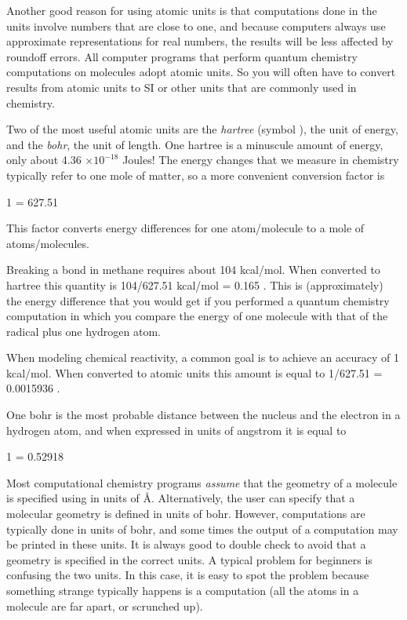 \documentclass[../Main/notes.tex]{subfiles}
\begin{document}
Another good reason for using atomic units is that computations done in the units involve numbers that are close to one, and because computers always use approximate representations for real numbers, the results will be less affected by roundoff errors.
All computer programs that perform quantum chemistry computations on molecules adopt atomic units.
So you will often have to convert results from atomic units to SI or other units that are commonly used in chemistry.

Two of the most useful atomic units are the \emph{hartree} (symbol  \Eh), the unit of energy, and the \emph{bohr}, the unit of length.
One hartree is a minuscule amount of energy, only about 4.36 $\times 10^{-18}$ Joules!
The energy changes that we measure in chemistry typically refer to one mole of matter, so a more convenient conversion factor is 
\begin{iequation}
1  = 627.51 
\end{iequation}
This factor converts energy differences for one atom/molecule to a mole of atoms/molecules.

\begin{example}
Breaking a  bond in methane requires about 104 kcal/mol. When converted to hartree this quantity is 104/627.51 kcal/mol = 0.165 \Eh.
This is (approximately) the energy difference that you would get if you performed a quantum chemistry computation in which you compare the energy of one  molecule with that of the  radical plus one hydrogen atom.
\end{example}

\begin{example}
When modeling chemical reactivity, a common goal is to achieve an accuracy of 1 kcal/mol. When converted to atomic units this amount is equal to 1/627.51 \Eh = 0.0015936 \Eh.
\end{example}

One bohr is the most probable distance between the nucleus and the electron in a hydrogen atom, and when expressed in units of angstrom it is equal to
\begin{iequation}
1  = 0.52918 \text{ \AA{}}
\end{iequation}
Most computational chemistry programs \emph{assume} that the geometry of a molecule is specified using in units of \AA{}.
Alternatively, the user can specify that a molecular geometry is defined in units of bohr.
However, computations are typically done in units of bohr, and some times the output of a computation may be printed in these units.
It is always good to double check to avoid that a geometry is specified in the correct units.
A typical problem for beginners is confusing the two units.
In this case, it is easy to spot the problem because something strange typically happens is a computation (all the atoms in a molecule are far apart, or scrunched up).
\end{document}
